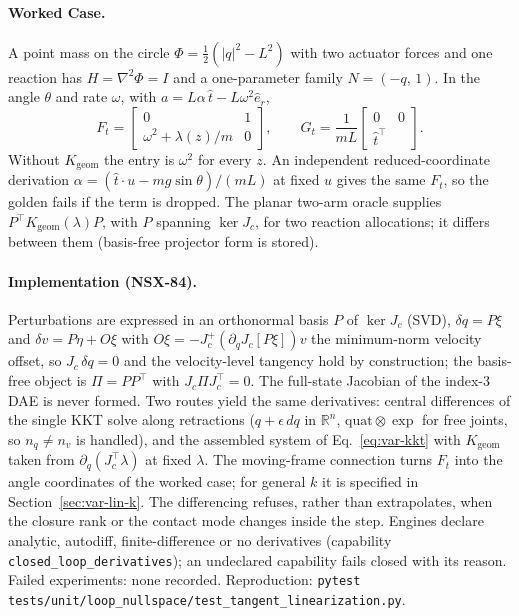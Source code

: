 \documentclass[11pt,a4paper]{article}
\begin{document}
\paragraph{Worked Case.}  A point mass on the circle
$\Phi=\tfrac12(\lvert q\rvert^2-L^2)$ with two actuator forces and one reaction
has $H=\nabla^2\Phi=I$ and a one-parameter family $N=(-q,\,1)$.  In the angle
$\theta$ and rate $\omega$, with $a=L\alpha\,\hat t-L\omega^2\hat e_r$,
\begin{equation}
F_t=\begin{bmatrix}0&1\\ \omega^2+\lambda(z)/m & 0\end{bmatrix},\qquad
G_t=\frac{1}{mL}\begin{bmatrix}0&0\\ \hat t^{\!\top}\end{bmatrix}.
\end{equation}
Without $K_{\mathrm{geom}}$ the entry is $\omega^2$ for every $z$.  An
independent reduced-coordinate derivation
$\alpha=(\hat t\cdot u-mg\sin\theta)/(mL)$ at fixed $u$ gives the same $F_t$,
so the golden fails if the term is dropped.  The planar two-arm oracle supplies
$P^{\!\top}K_{\mathrm{geom}}(\lambda)P$, with $P$ spanning $\ker J_c$, for two
reaction allocations; it differs between them (basis-free projector form is
stored).

\paragraph{Implementation (NSX-84).}  Perturbations are expressed in an
orthonormal basis $P$ of $\ker J_c$ (SVD), $\delta q=P\xi$ and
$\delta v=P\eta+O\xi$ with $O\xi=-J_c^{+}(\partial_qJ_c[P\xi])v$ the
minimum-norm velocity offset, so $J_c\,\delta q=0$ and the velocity-level
tangency hold by construction; the basis-free object is $\Pi=PP^{\!\top}$ with
$J_c\Pi J_c^{\!\top}=0$.  The full-state Jacobian of the index-3 DAE is never
formed.  Two routes yield the same derivatives: central differences of the
single KKT solve along retractions ($q+\epsilon\,dq$ in $\mathbb R^n$,
$\mathrm{quat}\otimes\exp$ for free joints, so $n_q\neq n_v$ is handled), and
the assembled system of Eq.~\eqref{eq:var-kkt} with $K_{\mathrm{geom}}$ taken
from $\partial_q(J_c^{\!\top}\lambda)$ at fixed $\lambda$.  The moving-frame
connection turns $F_t$ into the angle coordinates of the worked case; for
general $k$ it is specified in Section~\ref{sec:var-lin-k}.  The
differencing refuses, rather than extrapolates, when the closure rank or the
contact mode changes inside the step.  Engines declare analytic, autodiff,
finite-difference or no derivatives (capability
\texttt{closed\_loop\_derivatives}); an undeclared capability fails closed with
its reason.  Failed experiments: none recorded.  Reproduction:
\texttt{pytest tests/unit/loop\_nullspace/test\_tangent\_linearization.py}.
\end{document}
